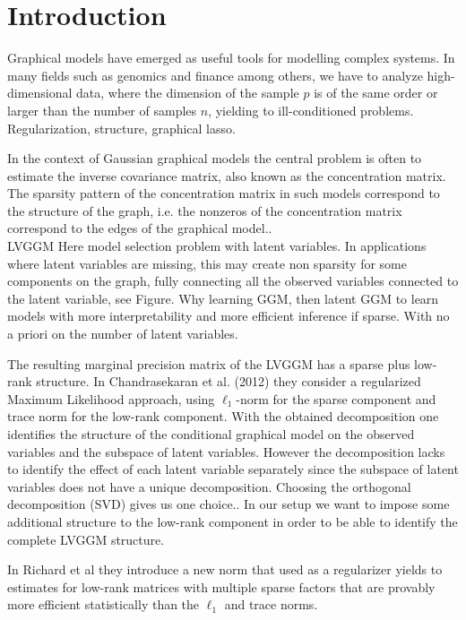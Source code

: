 \section{Introduction}
\label{intro}


Graphical models have emerged as useful tools for modelling complex systems. In many fields such as genomics and finance among others, we have to analyze high-dimensional data, where the dimension of the sample $p$ is of the same order or larger than the number of samples $n$, yielding to ill-conditioned problems. 
Regularization, structure, graphical lasso. 

In the context of Gaussian graphical models the central problem is often to estimate the inverse covariance matrix, also known as the concentration matrix. The sparsity pattern of the concentration matrix in such models correspond to the structure of the graph, i.e. the nonzeros of the concentration matrix correspond to the edges of the graphical model.. \\

LVGGM
Here model selection problem with latent variables. In applications where latent variables are missing, this may create non sparsity for some components on the graph, fully connecting all the observed variables connected to the latent variable, see Figure. 
Why learning GGM, then latent GGM to learn models with more interpretability and more efficient inference if sparse. With no a priori on the number of latent variables.

The resulting marginal precision matrix of the LVGGM has a sparse plus low-rank structure. In Chandrasekaran et al. (2012) they consider a regularized Maximum Likelihood approach, using $\ell_1$-norm for the sparse component and trace norm for the low-rank component. With the obtained decomposition one identifies the structure of the conditional graphical model on the observed variables and the subspace of latent variables. However the decomposition lacks to identify the effect of each latent variable separately since the subspace of latent variables does not have a unique decomposition. Choosing the orthogonal decomposition (SVD) gives us one choice.. In our setup we want to impose some additional structure to the low-rank component in order to be able to identify the complete LVGGM structure.  

In Richard et al they introduce a new norm that used as a regularizer yields to  estimates for low-rank matrices with multiple sparse factors that are provably more efficient statistically than the $\ell_1$ and trace norms.

